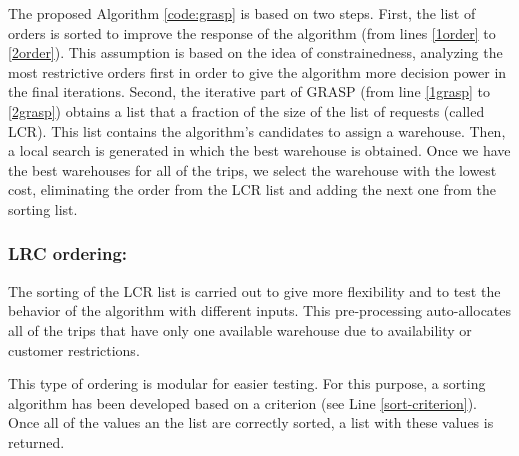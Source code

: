 \documentclass[letterpaper]{article} %
\begin{document}
The proposed Algorithm \ref{code:grasp} is based on two steps. First, the list of orders is sorted to improve the response of the algorithm (from lines \ref{1order} to \ref{2order}). This assumption is based on the idea of constrainedness, analyzing the most restrictive orders first in order to give the algorithm more decision power in the final iterations. Second, the iterative part of GRASP (from line \ref{1grasp} to \ref{2grasp}) obtains a list that a fraction of the size of the list of requests (called LCR). This list contains the algorithm's candidates to assign a warehouse. Then, a local search is generated in which the best warehouse is obtained. Once we have the best warehouses for all of the trips, we select the warehouse with the lowest cost, eliminating the order from the LCR list and adding the next one from the sorting list.

\subsubsection*{LRC ordering:}
The sorting of the LCR list is carried out to give more flexibility and to test the behavior of the algorithm with different inputs. This pre-processing auto-allocates all of the trips that have only one available warehouse due to availability or customer restrictions.

This type of ordering is modular for easier testing. For this purpose, a sorting algorithm has been developed based on a criterion (see Line \ref{sort-criterion}). Once all of the values an the list are correctly sorted, a list with these values is returned.
\end{document}
